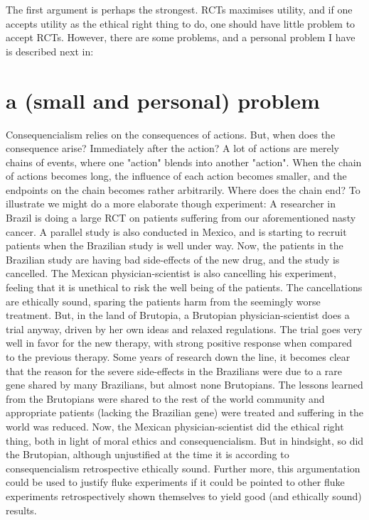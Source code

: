 \documentclass[12p]{article}
\begin{document}
The first argument is perhaps the strongest.
RCTs maximises utility, and if one accepts utility as the ethical right thing to do, one should have little problem to accept RCTs.
However, there are some problems, and a personal problem I have is described next in:


\section*{a (small and personal) problem}

Consequencialism relies on the consequences of actions.
But, when does the consequence arise?
Immediately after the action?
A lot of actions are merely chains of events, where one "action" blends into another "action".
When the chain of actions becomes long, the influence of each action becomes smaller, and the endpoints on the chain becomes rather arbitrarily.
Where does the chain end?
To illustrate we might do a more elaborate though experiment:
A researcher in Brazil is doing a large RCT on patients suffering from our aforementioned nasty cancer.
A parallel study is also conducted in Mexico, and is starting to recruit patients when the Brazilian study is well under way.
Now, the patients in the Brazilian study are having bad side-effects of the new drug, and the study is cancelled.
The Mexican physician-scientist is also cancelling his experiment, feeling that it is unethical to risk the well being of the patients.
The cancellations are ethically sound, sparing the patients harm from the seemingly worse treatment.
But, in the land of  Brutopia, a Brutopian physician-scientist does a trial anyway, driven by her own ideas and relaxed regulations.
The trial goes very well in favor for the new therapy, with strong positive response when compared to the previous therapy.
Some years of research down the line, it becomes clear that the reason for the severe side-effects in the Brazilians were due to a rare gene shared by many Brazilians, but almost none Brutopians.
The lessons learned from the Brutopians were shared to the rest of the world community and appropriate patients (lacking the Brazilian gene) were treated and suffering in the world was reduced.
Now, the Mexican physician-scientist did the ethical right thing, both in light of moral ethics and consequencialism.
But in hindsight, so did the Brutopian, although unjustified at the time it is according to consequencialism retrospective ethically sound.
Further more, this argumentation could be used to justify fluke experiments if it could be pointed to other fluke experiments retrospectively shown themselves to yield good (and ethically sound) results.
\end{document}
